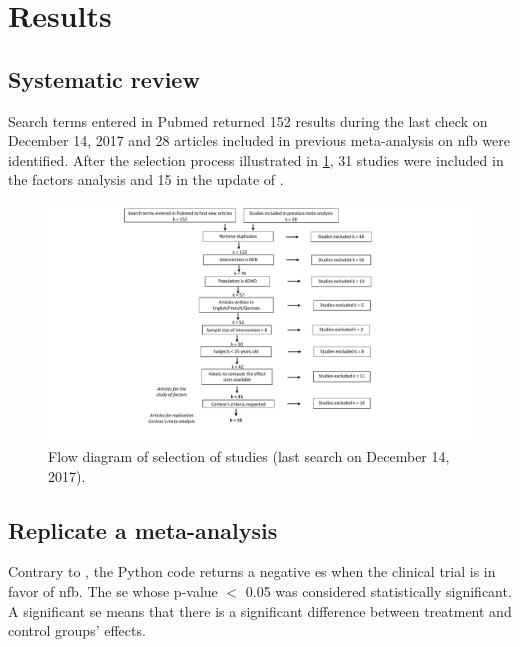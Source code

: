 


\section{Results}

\subsection{Systematic review}

Search terms entered in Pubmed returned 152 results during the last check on December 14, 2017 and 28 articles included in previous
 meta-analysis on \gls{nfb} were identified. After the selection process illustrated in \cref{Figure:systematic_review_workflow}, 
31 studies were included in the factors analysis and 15 in the update of \citet{Cortese2016}. 

\begin{figure}[h!]
  \centering
  \includegraphics[width=1.0\linewidth]{figures/meta_review_factors_analysis_how_studies_are_included_no_colors_2-columns_fitting_ima}
  \caption{Flow diagram of selection of studies (last search on December 14, 2017).}
  \label{Figure:systematic_review_workflow}
\end{figure}

\subsection{Replicate a meta-analysis}

Contrary to \citet{Cortese2016}, the Python code returns a negative \gls{es} when the clinical trial is in favor of \gls{nfb}. 
The \gls{se} whose p-value $<$ 0.05 was considered statistically significant. A significant \gls{se} means that there
is a significant difference between treatment and control groups' effects.

